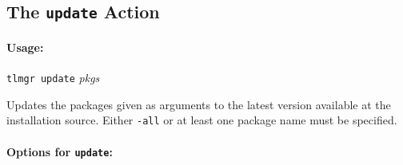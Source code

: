 \documentclass[11pt]{article}
\begin{document}
\subsection{The {\tt update} Action}
\label{update}

\paragraph{Usage:}

\begin{list}{}{}
\item \texttt{tlmgr update} \textsl{pkgs} 
\end{list}
Updates the packages given as arguments to the latest
version available at the installation source. Either
\texttt{-all} or at least one package name must be
specified.

\paragraph{Options for {\tt update}:}
\end{document}
